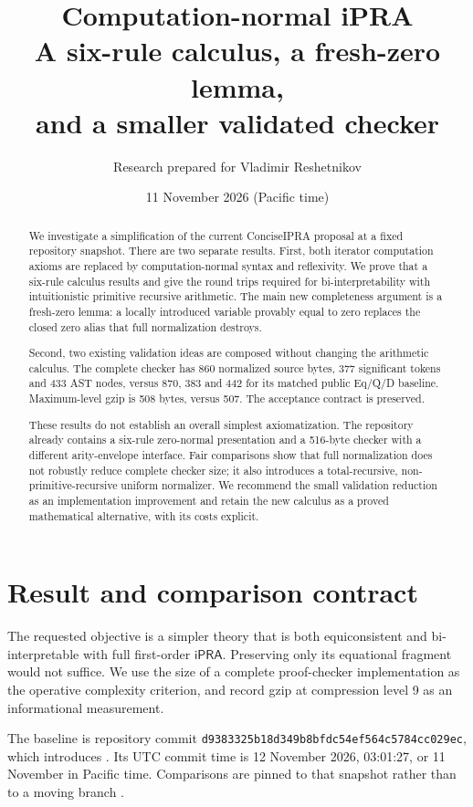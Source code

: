 \documentclass[11pt]{article}
\title{\textbf{Computation-normal iPRA}\\[4pt]
\large A six-rule calculus, a fresh-zero lemma,\\and a smaller validated checker}
\author{Research prepared for Vladimir Reshetnikov}
\date{11 November 2026 (Pacific time)}
\theoremstyle{definition}
\newcommand{\ipra}{\ensuremath{\mathsf{iPRA}}}
\newcommand{\code}[1]{\texttt{\detokenize{#1}}}
\newcommand{\repo}{\texttt{d9383325b18d349b8bfdc54ef564c5784cc029ec}}
\begin{document}
\maketitle
\begin{abstract}
We investigate a simplification of the current ConciseIPRA proposal at a
fixed repository snapshot. There are two separate results.
First, both iterator computation axioms are replaced by computation-normal
syntax and reflexivity. We prove that a six-rule calculus results and give
the round trips required for bi-interpretability with intuitionistic
primitive recursive arithmetic. The main new completeness argument is a
fresh-zero lemma: a locally introduced variable provably equal to zero
replaces the closed zero alias that full normalization destroys.

Second, two existing validation ideas are composed without changing the
arithmetic calculus. The complete checker has 860 normalized source bytes,
377 significant tokens and 433 AST nodes, versus 870, 383 and 442 for its
matched public Eq/Q/D baseline. Maximum-level gzip is 508 bytes, versus
507. The acceptance contract is preserved.

These results do not establish an overall simplest axiomatization.
The repository already contains a six-rule zero-normal presentation and a
516-byte checker with a different arity-envelope interface. Fair comparisons
show that full normalization does not robustly reduce complete checker
size; it also introduces a total-recursive, non-primitive-recursive uniform
normalizer. We recommend the small validation reduction as an
implementation improvement and retain the new calculus as a proved
mathematical alternative, with its costs explicit.
\end{abstract}
\vspace{1em}

\section{Result and comparison contract}
\label{sec:baseline}

The requested objective is a simpler theory that is both equiconsistent
and bi-interpretable with full first-order \ipra. Preserving only its
equational fragment would not suffice. We use the size of a complete
proof-checker implementation as the operative complexity criterion, and
record gzip at compression level 9 as an informational measurement.

The baseline is repository commit \repo, which introduces
\code{NativeZeroNormal.lean}. Its UTC commit time is 12 November 2026,
03:01:27, or 11 November in Pacific time. Comparisons are pinned to that
snapshot rather than to a moving branch \cite{repository}.
\end{document}
